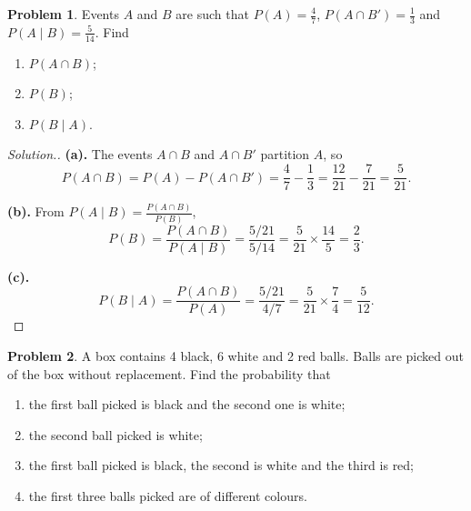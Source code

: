 \documentclass[12pt,a4paper]{report}
\theoremstyle{definition}
\theoremstyle{plain}
\theoremstyle{definition}
\newtheorem{problemx}{Problem}[section]
\newenvironment{problem}{\begin{problemx}}{\end{problemx}}
\newenvironment{solution}
  {\renewcommand{\qedsymbol}{}\begin{proof}[\textit{Solution}.]}
  {\end{proof}}
\begin{document}
\begin{problem}
Events $A$ and $B$ are such that $P(A)=\frac{4}{7}$, $P(A\cap B')=\frac{1}{3}$ and
$P(A\mid B)=\frac{5}{14}$. Find
\begin{enumerate}
\item[(a).] $P(A\cap B)$;
\item[(b).] $P(B)$;
\item[(c).] $P(B\mid A)$.
\end{enumerate}
\end{problem}

\begin{solution}
\textbf{(a).} The events $A\cap B$ and $A\cap B'$ partition $A$, so
\[P(A\cap B) = P(A)-P(A\cap B') = \frac{4}{7}-\frac{1}{3}
 = \frac{12}{21}-\frac{7}{21} = \frac{5}{21}.\]

\textbf{(b).} From $P(A\mid B)=\frac{P(A\cap B)}{P(B)}$,
\[P(B) = \frac{P(A\cap B)}{P(A\mid B)} = \frac{5/21}{5/14} = \frac{5}{21}\times\frac{14}{5}
 = \frac{2}{3}.\]

\textbf{(c).} \[P(B\mid A) = \frac{P(A\cap B)}{P(A)} = \frac{5/21}{4/7}
 = \frac{5}{21}\times\frac{7}{4} = \frac{5}{12}.\]
\end{solution}

\begin{problem}
A box contains 4 black, 6 white and 2 red balls. Balls are picked out of the box without
replacement. Find the probability that
\begin{enumerate}
\item[(a).] the first ball picked is black and the second one is white;
\item[(b).] the second ball picked is white;
\item[(c).] the first ball picked is black, the second is white and the third is red;
\item[(d).] the first three balls picked are of different colours.
\end{enumerate}
\end{problem}
\end{document}
